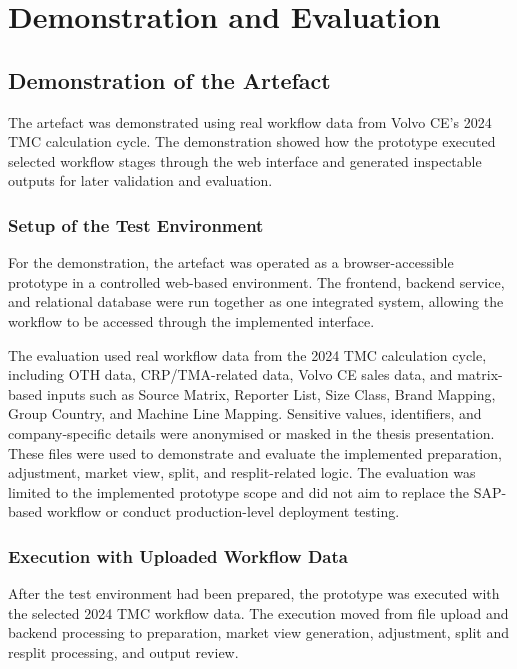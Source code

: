 

\chapter{Demonstration and Evaluation}
\label{cha:Evaluation}

\section{Demonstration of the Artefact}

The artefact was demonstrated using real workflow data from Volvo CE's 2024 TMC calculation cycle. The demonstration showed how the prototype executed selected workflow stages through the web interface and generated inspectable outputs for later validation and evaluation.

\subsection{Setup of the Test Environment}

For the demonstration, the artefact was operated as a browser-accessible prototype in a controlled web-based environment. The frontend, backend service, and relational database were run together as one integrated system, allowing the workflow to be accessed through the implemented interface.

The evaluation used real workflow data from the 2024 TMC calculation cycle, including OTH data, CRP/TMA-related data, Volvo CE sales data, and matrix-based inputs such as Source Matrix, Reporter List, Size Class, Brand Mapping, Group Country, and Machine Line Mapping. Sensitive values, identifiers, and company-specific details were anonymised or masked in the thesis presentation. These files were used to demonstrate and evaluate the implemented preparation, adjustment, market view, split, and resplit-related logic. The evaluation was limited to the implemented prototype scope and did not aim to replace the SAP-based workflow or conduct production-level deployment testing.



\subsection{Execution with Uploaded Workflow Data}

After the test environment had been prepared, the prototype was executed with the selected 2024 TMC workflow data. The execution moved from file upload and backend processing to preparation, market view generation, adjustment, split and resplit processing, and output review.

